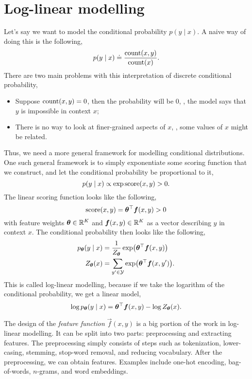 \section{Log-linear modelling} \label{sec:log-linear-modelling}

Let's say we want to model the conditional probability $p(y\mid x)$. A naive
way of doing this is the following, \[
  p(y\mid x) \doteq \frac{\mathrm{count}(x,y)}{\mathrm{count}(x)}
.\]
There are two main problems with this interpretation of discrete conditional
probability,
\begin{itemize}
  \item Suppose $\mathrm{count}(x,y)=0$, then the probability will be $0$, \ie,
    the model says that $y$ is impossible in context $x$;
  \item There is no way to look at finer-grained aspects of $x$, \ie, some
    values of $x$ might be related.
\end{itemize}

Thus, we need a more general framework for modelling conditional
distributions. One such general framework is to simply exponentiate some
scoring function that we construct, and let the conditional probability be proportional
to it, \[
  p(y\mid x) \propto \exp \mathrm{score}(x, y) > 0
.\]
The linear scoring function looks like the following, \[
  \mathrm{score}(x,y) = \bm{\theta}^\top \bm{f}(x, y) > 0
\]
with feature weights $\bm{\theta}\in\mathbb{R}^K$ and $\bm{f}(x,y)\in\mathbb{R}^K$ as a
vector describing $y$ in context $x$. The conditional probability then looks
like the following,
\begin{align*}
  p_{\vec{\theta}}(y\mid x) &= \frac{1}{Z_{\vec{\theta}}} \exp \lft( \transpose{\vec{\theta}} \vec{f}(x,y) \rgt) \\
  Z_{\vec{\theta}}(x) &= \sum_{y'\in\mathcal{Y}} \exp \lft( \transpose{\vec{\theta}} \vec{f}(x,y') \rgt)
.\end{align*}
This is called log-linear modelling, because if we take the logarithm of the
conditional probability, we get a linear model, \[
  \log p_{\bm{\theta}}(y \mid x) = \bm{\theta}^\top \bm{f}(x,y) - \log Z_{\bm{\theta}}(x)
.\]

The design of the \textit{feature function} $\vec{f}(x,y)$ is a big portion of
the work in log-linear modelling. It can be split into two parts: preprocessing
and extracting features. The preprocessing simply consists of steps such as tokenization,
lower-casing, stemming, stop-word removal, and reducing vocabulary. After the
preprocessing, we can obtain features. Examples include one-hot encoding,
bag-of-words, $n$-grams, and word embeddings.

